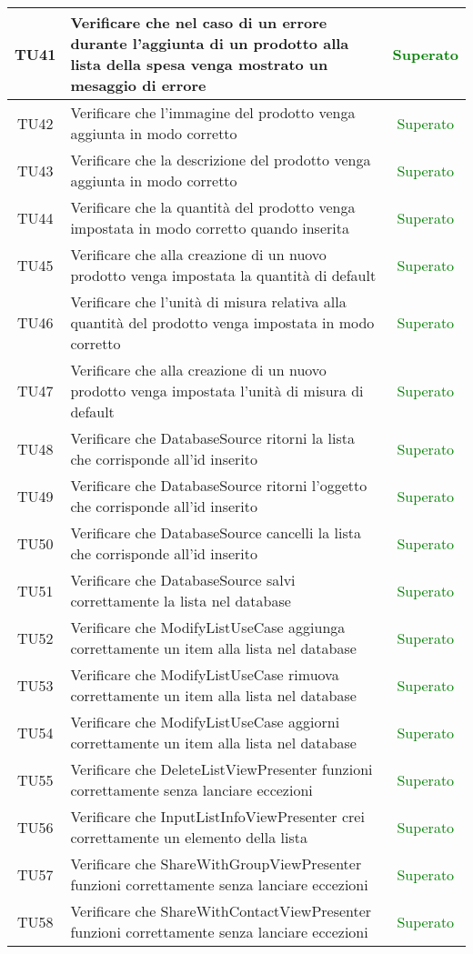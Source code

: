 \begin{center}
\begin{longtable}{|c|>{\centering}m{10cm}|c|}
		TU41 & Verificare che nel caso di un errore durante l'aggiunta di un prodotto alla lista della spesa venga mostrato un mesaggio di errore & \textcolor{Green}{Superato}\\ \hline
		TU42 & Verificare che l'immagine del prodotto venga aggiunta in modo corretto & \textcolor{Green}{Superato}\\ \hline
		TU43 & Verificare che la descrizione del prodotto venga aggiunta in modo corretto & \textcolor{Green}{Superato}\\ \hline
		TU44 & Verificare che la quantità del prodotto venga impostata in modo corretto quando inserita & \textcolor{Green}{Superato}\\ \hline
		TU45 & Verificare che alla creazione di un nuovo prodotto venga impostata la quantità di default & \textcolor{Green}{Superato}\\ \hline
		TU46 & Verificare che l'unità di misura relativa alla quantità del prodotto venga impostata in modo corretto & \textcolor{Green}{Superato}\\ \hline
		TU47 & Verificare che alla creazione di un nuovo prodotto venga impostata l'unità di misura di default & \textcolor{Green}{Superato}\\ \hline
		TU48 & Verificare che DatabaseSource ritorni la lista che corrisponde all'id inserito & \textcolor{Green}{Superato}\\ \hline
		TU49 & Verificare che DatabaseSource ritorni l'oggetto che corrisponde all'id inserito & \textcolor{Green}{Superato}\\ \hline
		TU50 & Verificare che DatabaseSource cancelli la lista che corrisponde all'id inserito & \textcolor{Green}{Superato}\\ \hline
		TU51 & Verificare che DatabaseSource salvi correttamente la lista nel database & \textcolor{Green}{Superato}\\ \hline
		TU52 & Verificare che ModifyListUseCase aggiunga correttamente un item alla lista nel database & \textcolor{Green}{Superato}\\ \hline
		TU53 & Verificare che ModifyListUseCase rimuova correttamente un item alla lista nel database & \textcolor{Green}{Superato}\\ \hline
		TU54 & Verificare che ModifyListUseCase aggiorni correttamente un item alla lista nel database & \textcolor{Green}{Superato}\\ \hline
		TU55 & Verificare che DeleteListViewPresenter funzioni correttamente senza lanciare eccezioni & \textcolor{Green}{Superato}\\ \hline
		TU56 & Verificare che InputListInfoViewPresenter crei correttamente un elemento della lista & \textcolor{Green}{Superato}\\ \hline
		TU57 & Verificare che ShareWithGroupViewPresenter funzioni correttamente senza lanciare eccezioni & \textcolor{Green}{Superato}\\ \hline
		TU58 & Verificare che ShareWithContactViewPresenter funzioni correttamente senza lanciare eccezioni & \textcolor{Green}{Superato}\\ \hline
	\end{longtable}
\end{center}
